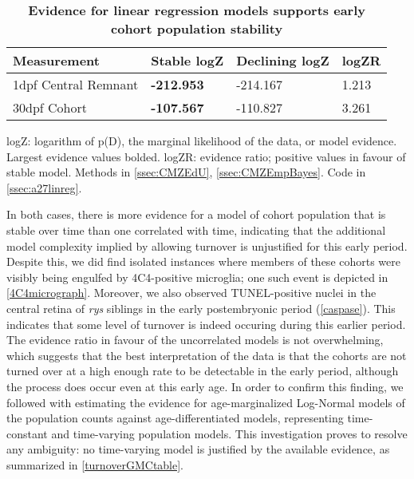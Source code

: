 \begin{table}[!ht]
    \centering
    \caption{{\bf Evidence for linear regression models supports early cohort population stability}}
    \begin{tabular}{|l|l|l|l|}
    \hline
    {\bf Measurement} & {\bf Stable logZ} & {\bf Declining logZ} & {\bf logZR}\\ \hline
    1dpf Central Remnant & {\bf -212.953} & -214.167 & 1.213\\ \hline    
    30dpf Cohort & {\bf -107.567} & -110.827 & 3.261\\ \hline
    \end{tabular}
   
    \begin{flushleft}logZ: logarithm of p(D), the marginal likelihood of the data, or model evidence.  Largest evidence values bolded. logZR: evidence ratio; positive values in favour of stable model.
    Methods in \autoref{ssec:CMZEdU}, \autoref{ssec:CMZEmpBayes}.
    Code in \autoref{ssec:a27linreg}.
    \end{flushleft}
    \label{turnovertable}
\end{table}

In both cases, there is more evidence for a model of cohort population that is stable over time than one correlated with time, indicating that the additional model complexity implied by allowing turnover is unjustified for this early period. Despite this, we did find isolated instances where members of these cohorts were visibly being engulfed by 4C4-positive microglia; one such event is depicted in \autoref{4C4micrograph}. Moreover, we also observed TUNEL-positive nuclei in the central retina of \textit{rys} siblings in the early postembryonic period (\autoref{caspase}). This indicates that some level of turnover is indeed occuring during this earlier period. The evidence ratio in favour of the uncorrelated models is not overwhelming, which suggests that the best interpretation of the data is that the cohorts are not turned over at a high enough rate to be detectable in the early period, although the process does occur even at this early age. In order to confirm this finding, we followed with estimating the evidence for age-marginalized Log-Normal models of the population counts against age-differentiated models, representing time-constant and time-varying population models. This investigation proves to resolve any ambiguity: no time-varying model is justified by the available evidence, as summarized in \autoref{turnoverGMCtable}.

